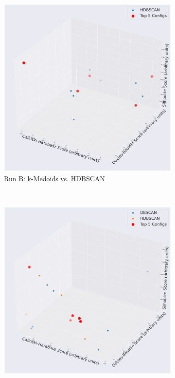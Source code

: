 \documentclass[10pt,oneside]{report}
\begin{document}
\begin{figure}[H]
\begin{subfigure}[b]{0.48\textwidth}
        \includegraphics[width=\textwidth]{./images/mpnet_kmedoidsvshdbscan.png}
        \caption{Run B: k-Medoids vs. HDBSCAN}
        \label{fig:mpnet_kmedoids_vs_hdbscan_h2h_config} %
    \end{subfigure}
    \\
    \vspace{1em}
    \begin{subfigure}[b]{0.48\textwidth}
        \centering
        \includegraphics[width=\textwidth]{./images/mpnet_dbscanvshdbscan.png}

\end{subfigure}
\end{figure}
\end{document}
